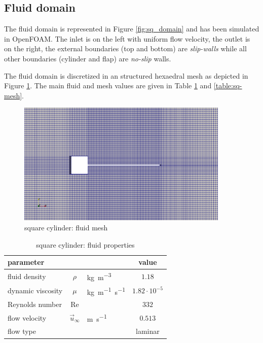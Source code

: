 \subsection{Fluid domain}

The fluid domain is represented in Figure \ref{fig:sq_domain} and has been simulated in OpenFOAM. The inlet is on the left with uniform flow velocity, the outlet is on the right, the external boundaries (top and bottom) are \textit{slip-walls} while all other boundaries (cylinder and flap) are \textit{no-slip} walls.


The fluid domain is discretized in an structured hexaedral mesh as depicted in Figure \ref{fig:sq_mesh}. The main fluid and mesh values are given in Table \ref{table:sq-fluid} and \ref{table:sq-mesh}. 

\begin{figure}[htbp!]
	\centering
	\includegraphics[width=0.9\textwidth]{images/sq-cyl/sq_mesh.png}
	\caption{square cylinder: fluid mesh}
	\label{fig:sq_mesh}
\end{figure}


\begin{table}[!htb]
	\begin{center}
		\begin{tabular}{ l c l | c } 
			parameter & & & value  \\ 
			\hline
			fluid density  & $\rho$ & \si{kg.m^{-3}} & $1.18$   \\
			dynamic viscosity & $\mu$& \si{kg.m^{-1}.s^{-1}} & $1.82 \cdot 10^{-5}$  \\
			Reynolds number & Re &  & $332$ \\
			flow velocity & $\vec{u}_{\infty}$ & \si{m.s^{-1}} & $0.513$ \\
			flow type & & & laminar \\
		\end{tabular}
	\end{center}
	\caption{square cylinder: fluid properties}
	\label{table:sq-fluid}
\end{table}



